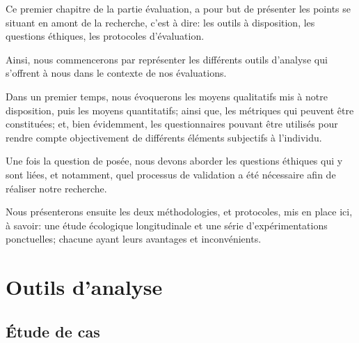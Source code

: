 \begin{resumChap}
Ce premier chapitre de la partie évaluation, a pour but de présenter les points se situant en amont de la recherche, c'est à dire: les outils à disposition, les questions éthiques, les protocoles d'évaluation.\par%
Ainsi, nous commencerons par représenter les différents outils d'analyse qui s'offrent à nous dans le contexte de nos évaluations.\par%
Dans un premier temps, nous évoquerons les moyens qualitatifs mis à notre disposition, puis les moyens quantitatifs; ainsi que, les métriques qui peuvent être constituées; et, bien évidemment, les questionnaires  pouvant être utilisés pour rendre compte objectivement de différents éléments subjectifs à l'individu.\par%
Une fois la question de  posée, nous devons aborder les questions éthiques qui y sont liées, et notamment, quel processus de validation a été nécessaire afin de réaliser notre recherche.\par%
Nous présenterons ensuite les deux méthodologies, et protocoles, mis en place ici, à savoir: une étude écologique longitudinale et une série d'expérimentations ponctuelles; chacune ayant leurs avantages et inconvénients.
\end{resumChap}
\section{Outils d'analyse}
  \subsection{Étude de cas}
